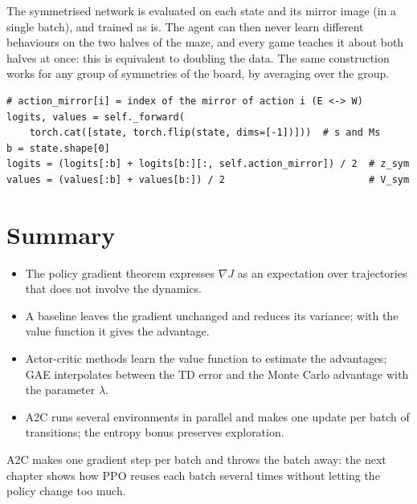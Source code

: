The symmetrised network is evaluated on each state and its mirror image (in
a single batch), and trained as is. The agent can then never learn
different behaviours on the two halves of the maze, and every game teaches
it about both halves at once: this is equivalent to doubling the data. The
same construction works for any group of symmetries of the board, by
averaging over the group.

\begin{lstlisting}[caption={The symmetrised network (\code{neural\_net.py},
  \code{ActorCriticCNN.forward})}]
# action_mirror[i] = index of the mirror of action i (E <-> W)
logits, values = self._forward(
    torch.cat([state, torch.flip(state, dims=[-1])]))  # s and Ms
b = state.shape[0]
logits = (logits[:b] + logits[b:][:, self.action_mirror]) / 2  # z_sym
values = (values[:b] + values[b:]) / 2                         # V_sym
\end{lstlisting}

\section{Summary}

\begin{itemize}[nosep]
  \item The policy gradient theorem expresses $\nabla J$ as an expectation
    over trajectories that does not involve the dynamics.
  \item A baseline leaves the gradient unchanged and reduces its variance;
    with the value function it gives the advantage.
  \item Actor-critic methods learn the value function to estimate the
    advantages; GAE interpolates between the TD error and the Monte Carlo
    advantage with the parameter $\lambda$.
  \item A2C runs several environments in parallel and makes one update per
    batch of transitions; the entropy bonus preserves exploration.
\end{itemize}
A2C makes one gradient step per batch and throws the batch away: the next
chapter shows how PPO reuses each batch several times without letting the
policy change too much.
